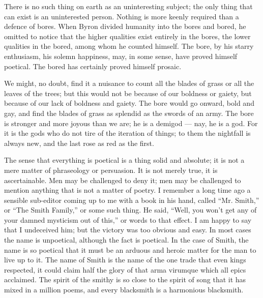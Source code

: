 
There is no such thing on earth as an uninteresting subject; the only thing that can exist is an uninterested person. Nothing is more keenly required than a defence of bores. When Byron divided humanity into the bores and bored, he omitted to notice that the higher qualities exist entirely in the bores, the lower qualities in the bored, among whom he counted himself. The bore, by his starry enthusiasm, his solemn happiness, may, in some sense, have proved himself poetical. The bored has certainly proved himself prosaic.

We might, no doubt, find it a nuisance to count all the blades of grass or all the leaves of the trees; but this would not be because of our boldness or gaiety, but because of our lack of boldness and gaiety. The bore would go onward, bold and gay, and find the blades of grass as splendid as the swords of an army. The bore is stronger and more joyous than we are; he is a demigod — nay, he is a god. For it is the gods who do not tire of the iteration of things; to them the nightfall is always new, and the last rose as red as the first.

The sense that everything is poetical is a thing solid and absolute; it is not a mere matter of phraseology or persuasion. It is not merely true, it is ascertainable. Men may be challenged to deny it; men may be challenged to mention anything that is not a matter of poetry. I remember a long time ago a sensible sub-editor coming up to me with a book in his hand, called “Mr. Smith,” or “The Smith Family,” or some such thing. He said, “Well, you won’t get any of your damned mysticism out of this,” or words to that effect. I am happy to say that I undeceived him; but the victory was too obvious and easy. In most cases the name is unpoetical, although the fact is poetical. In the case of Smith, the name is so poetical that it must be an arduous and heroic matter for the man to live up to it. The name of Smith is the name of the one trade that even kings respected, it could claim half the glory of that arma virumque which all epics acclaimed. The spirit of the smithy is so close to the spirit of song that it has mixed in a million poems, and every blacksmith is a harmonious blacksmith.


